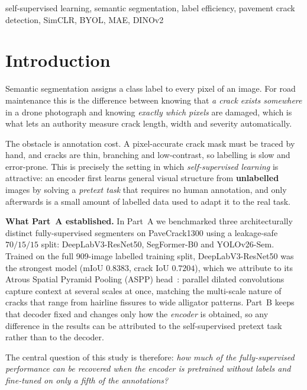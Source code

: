 \documentclass[conference]{IEEEtran}
\begin{document}
\begin{IEEEkeywords}
self-supervised learning, semantic segmentation, label efficiency, pavement crack
detection, SimCLR, BYOL, MAE, DINOv2
\end{IEEEkeywords}

\section{Introduction}

Semantic segmentation assigns a class label to every pixel of an image. For road
maintenance this is the difference between knowing that \emph{a crack exists
somewhere} in a drone photograph and knowing \emph{exactly which pixels} are
damaged, which is what lets an authority measure crack length, width and severity
automatically.

The obstacle is annotation cost. A pixel-accurate crack mask must be traced by hand,
and cracks are thin, branching and low-contrast, so labelling is slow and
error-prone. This is precisely the setting in which \emph{self-supervised learning}
is attractive: an encoder first learns general visual structure from
\textbf{unlabelled} images by solving a \emph{pretext task} that requires no human
annotation, and only afterwards is a small amount of labelled data used to adapt it
to the real task.

\textbf{What Part~A established.} In Part~A we benchmarked three architecturally
distinct fully-supervised segmenters on PaveCrack1300 using a leakage-safe
$70/15/15$ split: DeepLabV3-ResNet50, SegFormer-B0 and YOLOv26-Sem. Trained on the
full 909-image labelled training split, DeepLabV3-ResNet50 was the strongest model
(mIoU $0.8383$, crack IoU $0.7204$), which we attribute to its Atrous Spatial
Pyramid Pooling (ASPP) head~\cite{deeplab}: parallel dilated convolutions capture context at
several scales at once, matching the multi-scale nature of cracks that range from
hairline fissures to wide alligator patterns. Part~B keeps that decoder fixed and
changes only how the \emph{encoder} is obtained, so any difference in the results
can be attributed to the self-supervised pretext task rather than to the decoder.

The central question of this study is therefore: \emph{how much of the
fully-supervised performance can be recovered when the encoder is pretrained
without labels and fine-tuned on only a fifth of the annotations?}
\end{document}
